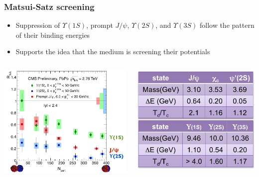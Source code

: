 \documentclass[compress]{beamer}
\begin{document}
\begin{frame}
\frametitle{Matsui-Satz screening}

\vspace{-0.2 cm}
\begin{itemize}
\item Suppression of $\Upsilon(1S)$, prompt $J/\psi$, $\Upsilon(2S)$, and $\Upsilon(3S)$ follow the pattern of their binding energies
\item Supports the idea that the medium is screening their potentials
\end{itemize}

\begin{columns}
\includegraphics[width=\linewidth]{dimuons/quarkonia_raa_centrality.png}

\includegraphics[width=\linewidth]{dimuons/thermometer_table.png}


\end{columns}
\end{frame}
\end{document}
